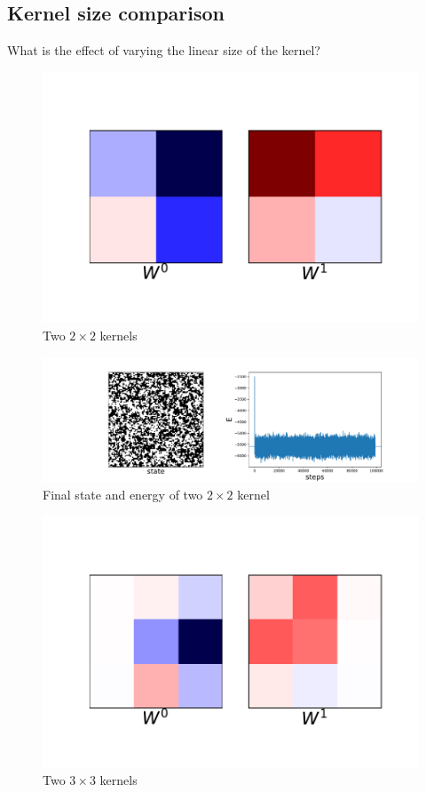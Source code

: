 \documentclass[12pt, two sided]{article}
\begin{document}
\subsection{Kernel size comparison}

What is the effect of varying the linear size of the kernel?

\begin{figure}[h!]
\includegraphics[width=\textwidth]{../figures/T_4.0_kernelDims_2-2_no_symmetries.pdf}
\caption{Two $2\times2$ kernels}
\end{figure}

\begin{figure}[h!]
\includegraphics[width=\textwidth]{../figures/L_100_T_4.0_kernelDims_2-2_no_symmetries.pdf}
\caption{Final state and energy of two $2\times2$ kernel}
\end{figure}

\begin{figure}[h!]
\includegraphics[width=\textwidth]{../figures/T_4.0_kernelDims_2-3_no_symmetries.pdf}
\caption{Two $3\times3$ kernels}
\end{figure}
\end{document}
